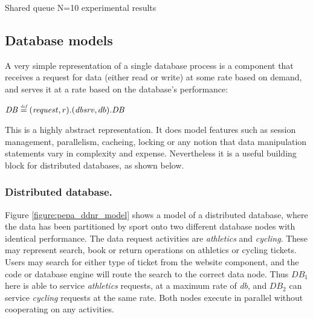 \begin{table}[h!]
	\begin{center}
		\caption{Shared queue N=10 experimental results}
		\label{table:queue_results}
	\end{center}
\end{table}

%
%
\FloatBarrier
\subsection{Database models}
A very simple representation of a single database process is a component that receives a request for data (either read or write) at some rate based on demand, and serves it at a rate based on the database's performance:
\begin{center}
$\mathit{DB} \stackrel{\mbox{\em {\tiny def}}}{=} (\mathit{request}, r).(\mathit{dbsrv}, db).\mathit{DB}$
\end{center}
This is a highly abstract representation.  It does model features such as session management, parallelism, cacheing, locking or any notion that data manipulation statements vary in complexity and expense.  Nevertheless it is a useful building block for distributed databases, as shown below.

%
%
\FloatBarrier
\subsubsection{Distributed database.} Figure \ref{figure:pepa_ddnr_model} shows a model of a distributed database, where the data has been partitioned by sport onto two different database nodes with identical performance.  The data request activities are {\itshape athletics} and {\itshape cycling}.  These may represent search, book or return operations on athletics or cycling tickets.  Users may search for either type of ticket from the website component, and the code or database engine will route the search to the correct data node.  Thus $\mathit{DB_1}$ here is able to service {\itshape athletics} requests, at a maximum rate of {\itshape db}, and $\mathit{DB_2}$ can service {\itshape cycling} requests at the same rate.  Both nodes execute in parallel without cooperating on any activities.

